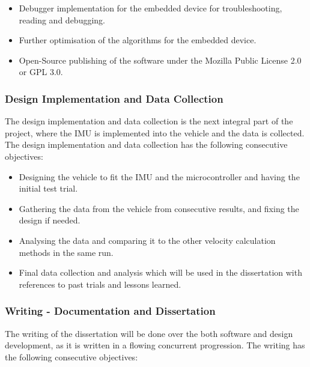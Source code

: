 \documentclass[
  10pt,
]{article}
\providecommand{\tightlist}{%
  \setlength{\itemsep}{0pt}\setlength{\parskip}{0pt}}
\begin{document}
\begin{itemize}
\tightlist
\item
  Debugger implementation for the embedded device for troubleshooting,
  reading and debugging.
\item
  Further optimisation of the algorithms for the embedded device.
\item
  Open-Source publishing of the software under the Mozilla Public
  License 2.0 or GPL 3.0.
\end{itemize}

\hypertarget{design-implementation-and-data-collection}{%
\subsubsection{Design Implementation and Data
Collection}\label{design-implementation-and-data-collection}}

The design implementation and data collection is the next integral part
of the project, where the IMU is implemented into the vehicle and the
data is collected. The design implementation and data collection has the
following consecutive objectives:

\begin{itemize}
\tightlist
\item
  Designing the vehicle to fit the IMU and the microcontroller and
  having the initial test trial.
\item
  Gathering the data from the vehicle from consecutive results, and
  fixing the design if needed.
\item
  Analysing the data and comparing it to the other velocity calculation
  methods in the same run.
\item
  Final data collection and analysis which will be used in the
  dissertation with references to past trials and lessons learned.
\end{itemize}

\hypertarget{writing---documentation-and-dissertation}{%
\subsubsection{Writing - Documentation and
Dissertation}\label{writing---documentation-and-dissertation}}

The writing of the dissertation will be done over the both software and
design development, as it is written in a flowing concurrent
progression. The writing has the following consecutive objectives:
\end{document}
